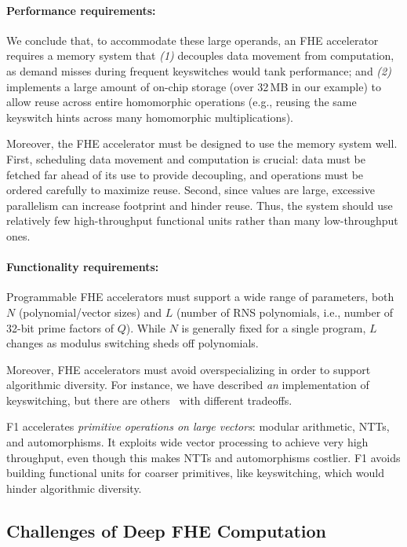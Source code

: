\paragraph{Performance requirements:}
We conclude that, to accommodate these large operands, an FHE accelerator
requires a memory system that \emph{(1)} decouples data movement from
computation, as demand misses during frequent keyswitches would tank
performance; and \emph{(2)} implements a large amount of on-chip storage (over
32\,MB in our example) to allow reuse across entire homomorphic operations
(e.g., reusing the same keyswitch hints across many homomorphic
multiplications).

Moreover, the FHE accelerator must be designed to use the memory system well.
First, scheduling data movement and computation is crucial: data must be
fetched far ahead of its use to provide decoupling, and operations must be
ordered carefully to maximize reuse. Second, since values are large, excessive
parallelism can increase footprint and hinder reuse. Thus, the system should
use relatively few high-throughput functional units rather than many
low-throughput ones.

\paragraph{Functionality requirements:}
Programmable FHE accelerators must support a wide range of parameters, both $N$
(polynomial/vector sizes) and $L$ (number of RNS polynomials, i.e., number of
32-bit prime factors of $Q$). While $N$ is generally fixed for a single
program, $L$ changes as modulus switching sheds off polynomials.

Moreover, FHE accelerators must avoid overspecializing in order to support algorithmic diversity.
For instance, we have described \emph{an} implementation of keyswitching, but
there are others~\cite{kim:jmir18:helr,gentry:crypto2012:homomorphic}
with different tradeoffs.

F1 accelerates \emph{primitive operations on large vectors}:
modular arithmetic, NTTs, and automorphisms. It exploits wide vector processing
to achieve very high throughput, even though this makes NTTs and automorphisms
costlier. F1 avoids building functional units for coarser primitives, like
keyswitching, which would hinder algorithmic diversity.

\subsection{Challenges of Deep FHE Computation}\label{sec:deepChallenges}

